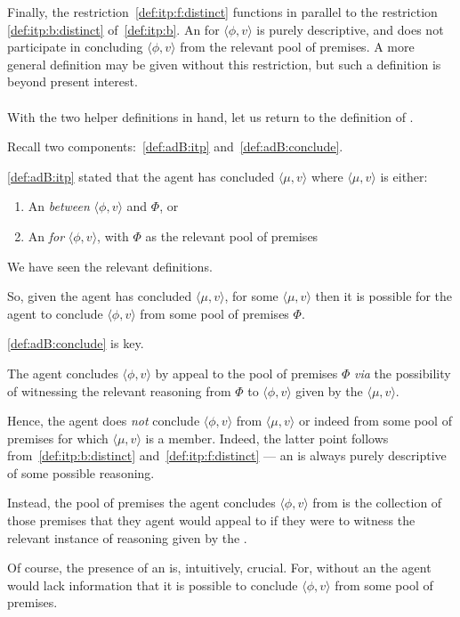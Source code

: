 \begin{note}
  Finally, the restriction~\ref{def:itp:f:distinct} functions in parallel to the restriction \ref{def:itp:b:distinct} of~\autoref{def:itp:b}.
  An  for \(\langle \phi,v \rangle\) is purely descriptive, and does not participate in concluding \(\langle \phi,v \rangle\) from the relevant pool of premises.
  A more general definition may be given without this restriction, but such a definition is beyond present interest.
\end{note}

\paragraph*{\adB{}}

\begin{note}
  With the two helper definitions in hand, let us return to the definition of \adB{}.

  Recall two components:~\ref{def:adB:itp} and~\ref{def:adB:conclude}.

  \ref{def:adB:itp} stated that the agent has concluded \(\langle \mu,v \rangle\) where \(\langle \mu,v \rangle\) is either:
  \begin{enumerate}[label=(\alph*)]
  \item An \itp{} \emph{between} \(\langle \phi,v \rangle\) and \(\Phi\), or
  \item An \itp{} \emph{for} \(\langle \phi,v \rangle\), with \(\Phi\) as the relevant pool of premises
  \end{enumerate}
  We have seen the relevant definitions.

  So, given the agent has concluded \(\langle \mu,v \rangle\), for some  \(\langle \mu,v \rangle\) then it is possible for the agent to conclude \(\langle \phi,v \rangle\) from some pool of premises \(\Phi\).

  \ref{def:adB:conclude} is key.

  The agent concludes \(\langle \phi,v \rangle\) by appeal to the pool of premises \(\Phi\) \emph{via} the possibility of witnessing the relevant reasoning from \(\Phi\) to \(\langle \phi,v \rangle\) given by the  \(\langle \mu,v \rangle\).

  Hence, the agent does \emph{not} conclude \(\langle \phi,v \rangle\) from \(\langle \mu,v \rangle\) or indeed from some pool of premises for which \(\langle \mu,v  \rangle\) is a member.
  Indeed, the latter point follows from~\ref{def:itp:b:distinct} and~\ref{def:itp:f:distinct} --- an  is always purely descriptive of some possible reasoning.

  Instead, the pool of premises the agent concludes \(\langle \phi,v \rangle\) from is the collection of those premises that they agent would appeal to if they were to witness the relevant instance of reasoning given by the .

  Of course, the presence of an  is, intuitively, crucial.
  For, without an  the agent would lack information that it is possible to conclude \(\langle \phi,v \rangle\) from some pool of premises.
\end{note}

